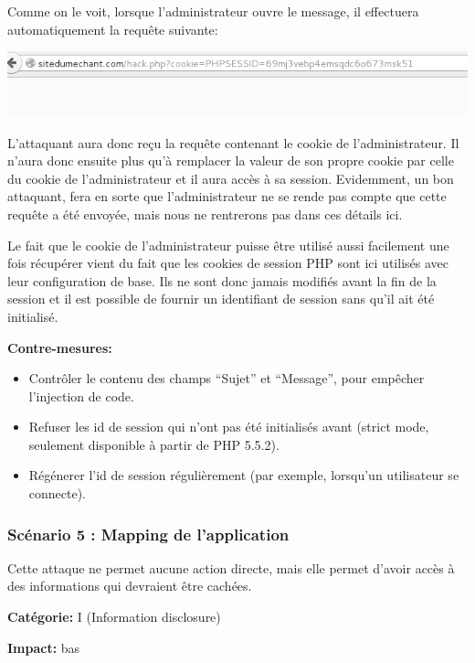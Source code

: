 \documentclass{article}
\begin{document}
Comme on le voit, lorsque l'administrateur ouvre le message, il
effectuera automatiquement la requête suivante:

\includegraphics{images/xss6.png}

L'attaquant aura donc reçu la requête contenant le cookie de
l'administrateur. Il n'aura donc ensuite plus qu'à remplacer la valeur
de son propre cookie par celle du cookie de l'administrateur et il aura
accès à sa session. Evidemment, un bon attaquant, fera en sorte que
l'administrateur ne se rende pas compte que cette requête a été envoyée,
mais nous ne rentrerons pas dans ces détails ici.

Le fait que le cookie de l'administrateur puisse être utilisé aussi
facilement une fois récupérer vient du fait que les cookies de session
PHP sont ici utilisés avec leur configuration de base. Ils ne sont donc
jamais modifiés avant la fin de la session et il est possible de fournir
un identifiant de session sans qu'il ait été initialisé.

\textbf{Contre-mesures:}

\begin{itemize}
\tightlist
\item
  Contrôler le contenu des champs ``Sujet'' et ``Message'', pour
  empêcher l'injection de code.
\item
  Refuser les id de session qui n'ont pas été initialisés avant (strict
  mode, seulement disponible à partir de PHP 5.5.2).
\item
  Régénerer l'id de session régulièrement (par exemple, lorsqu'un
  utilisateur se connecte).
\end{itemize}

\hypertarget{scuxe9nario-5-mapping-de-lapplication}{%
\subsubsection{Scénario 5 : Mapping de
l'application}\label{scuxe9nario-5-mapping-de-lapplication}}

Cette attaque ne permet aucune action directe, mais elle permet d'avoir
accès à des informations qui devraient être cachées.

\textbf{Catégorie:} I (Information disclosure)

\textbf{Impact:} bas
\end{document}
